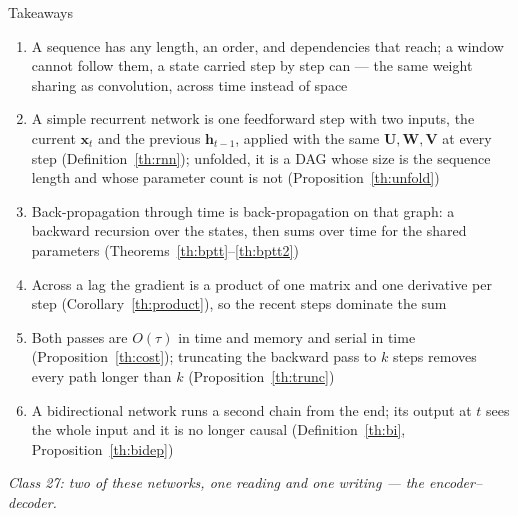\documentclass[aspectratio=169, 11pt]{beamer}
\newcommand{\bridge}[1]{%
  {\scriptsize\itshape\color{mcMuted} #1\par}\vspace{0.35em}}
\newcommand{\nosrc}{}       %
\begin{document}
\begin{frame}{Takeaways}
  \nosrc
  \vspace{-0.1em}
  {\scriptsize
  \begin{enumerate}\itemsep0.24em
    \item A sequence has any length, an order, and dependencies that
          reach; a window cannot follow them, a state carried step by step
          can --- the same weight sharing as convolution, across time
          instead of space
    \item A simple recurrent network is one feedforward step with two
          inputs, the current $\mathbf{x}_t$ and the previous $\mathbf{h}_{t-1}$,
          applied with the same $\mathbf{U}, \mathbf{W}, \mathbf{V}$ at every
          step (Definition~\ref{th:rnn}); unfolded, it is a DAG whose size
          is the sequence length and whose parameter count is not
          (Proposition~\ref{th:unfold})
    \item Back-propagation through time is back-propagation on that
          graph: a backward recursion over the states, then sums over time
          for the shared parameters (Theorems~\ref{th:bptt}--\ref{th:bptt2})
    \item Across a lag the gradient is a product of one matrix and one
          derivative per step (Corollary~\ref{th:product}), so the recent
          steps dominate the sum
    \item Both passes are $O(\tau)$ in time and memory and serial in time
          (Proposition~\ref{th:cost}); truncating the backward pass to $k$
          steps removes every path longer than $k$
          (Proposition~\ref{th:trunc})
    \item A bidirectional network runs a second chain from the end; its
          output at $t$ sees the whole input and it is no longer causal
          (Definition~\ref{th:bi}, Proposition~\ref{th:bidep})
  \end{enumerate}}
  \vspace{-0.2em}
  \bridge{Class 27: two of these networks, one reading and one writing --- the encoder--decoder.}
\end{frame}
\end{document}
